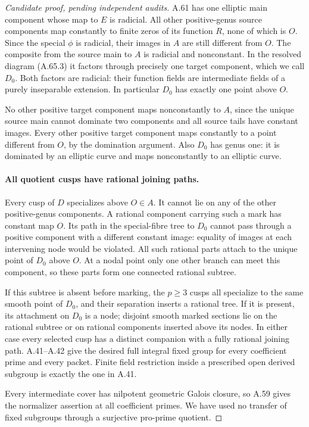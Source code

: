 \begin{proof}[Candidate proof, pending independent audits]
A.61 has one elliptic main component whose
map to \(E\) is radicial. All other
positive-genus source components map
constantly to finite zeros of its function
\(R\), none of which is \(O\). Since the
special \(\phi\) is radicial, their images
in \(A\) are still different from \(O\).
The composite from the source main to
\(A\) is radicial and nonconstant. In
the resolved diagram (A.65.3) it factors
through precisely one target component,
which we call \(D_0\). Both factors are
radicial: their function fields are
intermediate fields of a purely inseparable
extension. In particular \(D_0\) has
exactly one point above \(O\).

No other positive target component maps
nonconstantly to \(A\), since the unique
source main cannot dominate two components
and all source tails have constant images.
Every other positive target component
maps constantly to a point different from
\(O\), by the domination argument. Also
\(D_0\) has genus one: it is dominated
by an elliptic curve and maps nonconstantly
to an elliptic curve.

\paragraph{All quotient cusps have rational joining paths.}
Every cusp of \(D\) specializes above
\(O\in A\). It cannot lie on any of the
other positive-genus components. A rational
component carrying such a mark has constant
map \(O\). Its path in the special-fibre
tree to \(D_0\) cannot pass through a
positive component with a different
constant image: equality of images at
each intervening node would be violated.
All such rational parts attach to the
unique point of \(D_0\) above \(O\).
At a nodal point only one other branch can
meet this component, so these parts form
one connected rational subtree.

If this subtree is absent before marking,
the \(p\ge3\) cusps all specialize to
the same smooth point of \(D_0\), and
their separation inserts a rational tree.
If it is present, its attachment on
\(D_0\) is a node; disjoint smooth marked
sections lie on the rational subtree or
on rational components inserted above
its nodes. In either case every selected
cusp has a distinct companion with a
fully rational joining path. A.41--A.42
give the desired full integral fixed
group for every coefficient prime and
every packet. Finite field restriction
inside a prescribed open derived subgroup
is exactly the one in A.41.

Every intermediate cover has nilpotent
geometric Galois closure, so A.59 gives
the normalizer assertion at all coefficient
primes. We have used no transfer of fixed
subgroups through a surjective pro-prime
quotient.


\end{proof}
